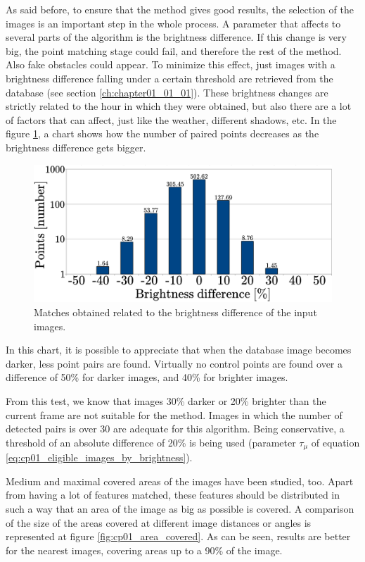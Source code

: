 As said before, to ensure that the method gives good results, the selection of the images is an important step in the whole process. A parameter that affects to several parts of the algorithm is the brightness difference. If this change is very big, the point matching stage could fail, and therefore the rest of the method. Also fake obstacles could appear. To minimize this effect, just images with a brightness difference falling under a certain threshold are retrieved from the database (see section \ref{ch:chapter01_01_01}). These brightness changes are strictly related to the hour in which they were obtained, but also there are a lot of factors that can affect, just like the weather, different shadows, etc. In the figure \ref{fig:cp01_brightness_vs_matches}, a chart shows how the number of paired points decreases as the brightness difference gets bigger.

\begin{figure}[t]
\centering
\includegraphics[width=\textwidth]{brightness_vs_matches}
\caption{Matches obtained related to the brightness difference of the input images.}\label{fig:cp01_brightness_vs_matches}
\end{figure}

In this chart, it is possible to appreciate that when the database image becomes darker, less point pairs are found. Virtually no control points are found over a difference of 50\% for darker images, and 40\% for brighter images.

From this test, we know that images 30\% darker or 20\% brighter than the current frame are not suitable for the method. Images in which the number of detected pairs is over 30 are adequate for this algorithm. Being conservative, a threshold of an absolute difference of 20\% is being used (parameter $\tau_{\mu}$ of equation \ref{eq:cp01_eligible_images_by_brightness}).

Medium and maximal covered areas of the images have been studied, too. Apart from having a lot of features matched, these features should be distributed in such a way that an area of the image as big as possible is covered. A comparison of the size of the areas covered at different image distances or angles is represented at figure \ref{fig:cp01_area_covered}. As can be seen, results are better for the nearest images, covering areas up to a 90\% of the image.

